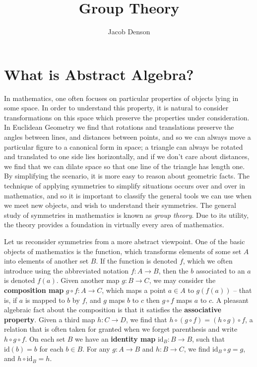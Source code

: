 

\title{Group Theory}
\author{Jacob Denson}



\maketitle
\tableofcontents
{}

\chapter{What is Abstract Algebra?}

In mathematics, one often focuses on particular properties of objects lying in some space. In order to understand this property, it is natural to consider transformations on this space which preserve the properties under consideration. In Euclidean Geometry we find that rotations and translations preserve the angles between lines, and distances between points, and so we can always move a particular figure to a canonical form in space; a triangle can always be rotated and translated to one side lies horizontally, and if we don't care about distances, we find that we can dilate space so that one line of the triangle has length one. By simplifying the scenario, it is more easy to reason about geometric facts. The technique of applying symmetries to simplify situations occurs over and over in mathematics, and so it is important to classify the general tools we can use when we meet new objects, and wish to understand their symmetries. The general study of symmetries in mathematics is known as {\it group theory}. Due to its utility, the theory provides a foundation in virtually every area of mathematics.

Let us reconsider symmetries from a more abstract viewpoint. One of the basic objects of mathematics is the function, which transforms elements of some set $A$ into elements of another set $B$. If the function is denoted $f$, which we often introduce using the abbreviated notation $f: A \to B$, then the $b$ associated to an $a$ is denoted $f(a)$. Given another map $g: B \to C$, we may consider the {\bf composition map} $g \circ f: A \to C$, which maps a point $a \in A$ to $g(f(a))$ -- that is, if $a$ is mapped to $b$ by $f$, and $g$ maps $b$ to $c$ then $g \circ f$ maps $a$ to $c$. A pleasant algebraic fact about the composition is that it satisfies the {\bf associative property}. Given a third map $h:C \to D$, we find that $h \circ (g \circ f) = (h \circ g) \circ f$, a relation that is often taken for granted when we forget parenthesis and write $h \circ g \circ f$. On each set $B$ we have an {\bf identity map} $\text{id}_B: B \to B$, such that $\text{id}(b) = b$ for each $b \in B$. For any $g: A \to B$ and $h: B \to C$, we find $\text{id}_B \circ g = g$, and $h \circ \text{id}_B = h$. 

